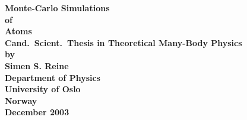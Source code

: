 \documentclass[twoside,a4paper,12pt]{report}
\begin{document}
\begin{titlepage}
\begin{center}
  \phantom{A}
  \vspace{0.2cm}
  {\bf \Huge Monte-Carlo Simulations \\[1mm]
  of\\[5mm] Atoms} \\
  \vspace{1.5cm}
  {\bf \large Cand.\ Scient.\ Thesis in Theoretical Many-Body Physics} \\
  \vspace{0.5cm}
  {\bf \large by \\[5mm] Simen S. Reine} \\
  \vspace{2cm}
  \vspace{2cm}
  {\bf Department of Physics \\ University of Oslo \\ Norway}\\
  \vspace{1.5cm}
  {\bf December 2003} \\
\end{center}
\end{titlepage}

\clearpage
\thispagestyle{empty}
\cleardoublepage
\pagestyle{headings}





\clearpage
\setlength{\parskip}{0pt}  %
\tableofcontents
\thispagestyle{plain}

\clearpage



\clearpage


\clearpage


\clearpage


\clearpage


\clearpage


\clearpage


\clearpage


\appendix



\clearpage

\cite{ram_mohan2002}



\end{document}
